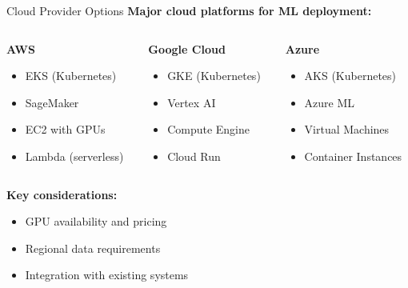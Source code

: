 \documentclass[../main.tex]{subfiles}
\begin{document}
\begin{frame}{Cloud Provider Options}
    \textbf{Major cloud platforms for ML deployment:}

    \bigskip

    \begin{columns}
        \begin{column}{0.33\textwidth}
            \textbf{AWS}
            \begin{itemize}
                \item EKS (Kubernetes)
                \item SageMaker
                \item EC2 with GPUs
                \item Lambda (serverless)
            \end{itemize}
        \end{column}

        \begin{column}{0.33\textwidth}
            \textbf{Google Cloud}
            \begin{itemize}
                \item GKE (Kubernetes)
                \item Vertex AI
                \item Compute Engine
                \item Cloud Run
            \end{itemize}
        \end{column}

        \begin{column}{0.33\textwidth}
            \textbf{Azure}
            \begin{itemize}
                \item AKS (Kubernetes)
                \item Azure ML
                \item Virtual Machines
                \item Container Instances
            \end{itemize}
        \end{column}
    \end{columns}

    \bigskip

    \textbf{Key considerations:}
    \begin{itemize}
        \item GPU availability and pricing
        \item Regional data requirements
        \item Integration with existing systems
    \end{itemize}
\end{frame}
\end{document}
